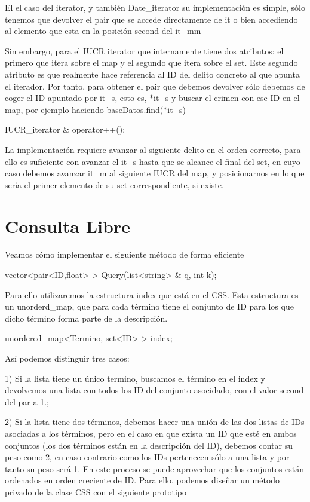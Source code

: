 El el caso del iterator, y también Date\+\_\+iterator su implementación es simple, sólo tenemos que devolver el pair que se accede directamente de it o bien accediendo al elemento que esta en la posición second del it\+\_\+mm

Sin embargo, para el I\+U\+C\+R iterator que internamente tiene dos atributos\+: el primero que itera sobre el map y el segundo que itera sobre el set. Este segundo atributo es que realmente hace referencia al I\+D del delito concreto al que apunta el iterador. Por tanto, para obtener el pair que debemos devolver sólo debemos de coger el I\+D apuntado por it\+\_\+s, esto es, $\ast$it\+\_\+s y buscar el crimen con ese I\+D en el map, por ejemplo haciendo base\+Datos.\+find($\ast$it\+\_\+s)

\begin{DoxyItemize}
\item I\+U\+C\+R\+\_\+iterator \& operator++();\end{DoxyItemize}
La implementación requiere avanzar al siguiente delito en el orden correcto, para ello es suficiente con avanzar el it\+\_\+s hasta que se alcance el final del set, en cuyo caso debemos avanzar it\+\_\+m al siguiente I\+U\+C\+R del map, y posicionarnos en lo que sería el primer elemento de su set correspondiente, si existe.\hypertarget{index_consulta}{}\section{Consulta Libre}\label{index_consulta}
Veamos cómo implementar el siguiente método de forma eficiente 
\begin{DoxyCode}
vector<pair<ID,float> > Query(list<string> & q, \textcolor{keywordtype}{int} k);   
\end{DoxyCode}


Para ello utilizaremos la estructura index que está en el C\+S\+S. Esta estructura es un unorderd\+\_\+map, que para cada término tiene el conjunto de I\+D para los que dicho término forma parte de la descripción. 
\begin{DoxyCode}
unordered\_map<Termino, set<ID> > index;
\end{DoxyCode}


Así podemos distinguir tres casos\+:

\begin{DoxyItemize}
\item 1) Si la lista tiene un único termino, buscamos el término en el index y devolvemos una lista con todos los I\+D del conjunto asocidado, con el valor second del par a 1.; \item 2) Si la lista tiene dos términos, debemos hacer una unión de las dos listas de I\+Ds asociadas a los términos, pero en el caso en que exista un I\+D que esté en ambos conjuntos (los dos términos están en la descripción del I\+D), debemos contar su peso como 2, en caso contrario como los I\+Ds pertenecen sólo a una lista y por tanto su peso será 1. En este proceso se puede aprovechar que los conjuntos están ordenados en orden creciente de I\+D. Para ello, podemos diseñar un método privado de la clase C\+S\+S con el siguiente prototipo\end{DoxyItemize}

